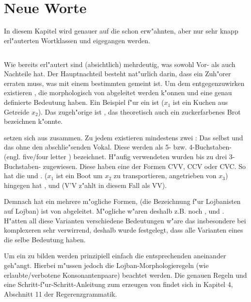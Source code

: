 \chapter{Neue Worte}
In diesem Kapitel wird genauer auf die schon erw"ahnten, aber nur sehr knapp erl"auterten Wortklassen  und  eigegangen
werden.

\section{}
Wie bereits erl"autert sind  (absichtlich) mehrdeutig, was sowohl Vor- als auch Nachteile hat. Der Hauptnachteil besteht nat"urlich
darin, dass ein Zuh"orer erraten muss, was mit einem bestimmten  gemeint ist. Um dem entgegenzuwirken existieren , die
morphologisch von  abgeleitet werden k"onnen und eine genau definierte Bedeutung haben. Ein Beispiel f"ur ein  ist
 ($x_1$ ist ein Kuchen aus Getreide $x_2$). Das zugeh"orige  ist , das theoretisch
auch ein zuckerfarbenes Brot bezeichnen k"onnte.

 setzen sich aus  zusammen. Zu jedem  existieren mindestens zwei : Das  selbst und das  ohne
den abschlie"senden Vokal. Diese  werden als 5- bzw. 4-Buchstaben- (engl. five/four letter ) bezeichnet. 
H"aufig verwendeten  wurden bis zu drei 3-Buchstaben- zugewiesen. Diese  haben eine der Formen CVV, CCV oder
CVC.
So hat  die   und .  ($x_1$ ist ein Boot um $x_2$ zu transportieren, angetrieben von $x_3$) hingegen hat ,  und  (V'V z"ahlt in diesem Fall als VV).

Demnach hat ein  mehrere m"ogliche Formen,  (die Bezeichnung f"ur Lojbanisten auf Lojban) ist von
 abgeleitet. M"ogliche  w"aren deshalb z.B. noch ,  und . H"atten all diese Varianten verschiedene Bedeutungen w"are das insbesondere bei komplexeren  sehr verwirrend, deshalb wurde festgelegt, dass alle Varianten eines  die selbe Bedeutung haben.

Um ein  zu bilden werden prinzipiell einfach die entsprechenden  aneinander geh"angt. Hierbei m"ussen
jedoch die Lojban-Morphologieregeln (wie erlaubte/verbotene Konsonantenpaare) beachtet werden. Die genauen Regeln und eine
Schritt-f"ur-Schritt-Anleitung zum erzeugen von  findet sich in Kapitel 4, Abschnitt 11 der Regerenzgrammatik.

